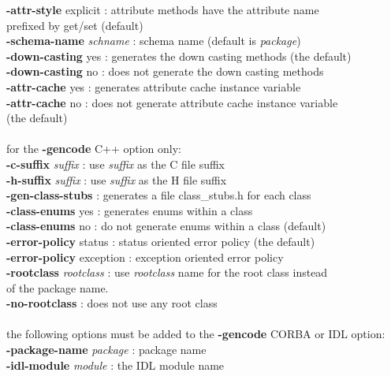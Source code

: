 \begin{tabbing}
{\bf -attr-style} explicit         \>: attribute methods have the attribute name\\
                             \>\> prefixed by get/set (default)\\
{\bf -schema-name} \emph{schname}   \>: schema name (default is \emph{package})\\
{\bf -down-casting} yes            \>: generates the down casting methods (the default)\\
{\bf -down-casting} no             \>: does not generate the down casting methods\\
{\bf -attr-cache} yes              \>: generates attribute cache instance variable\\
{\bf -attr-cache} no               \>: does not generate attribute cache instance variable\\
\>\> (the default)\\
\\
for the {\bf -gencode} C++ option only:\\
{\bf -c-suffix} \emph{suffix}           \>: use \emph{suffix} as the C file suffix\\
{\bf -h-suffix} \emph{suffix}           \>: use \emph{suffix} as the H file suffix\\
{\bf -gen-class-stubs}             \>: generates a file class\_stubs.h for each class\\
{\bf -class-enums} yes             \>: generates enums within a class\\
{\bf -class-enums} no              \>: do not generate enums within a class (default)\\
{\bf -error-policy} status         \>: status oriented error policy (the default)\\
{\bf -error-policy} exception      \>: exception oriented error policy\\
{\bf -rootclass} \emph{rootclass}    \>: use \emph{rootclass} name for the root class instead\\
                             \>\>  of the package name.\\
{\bf -no-rootclass}                \>: does not use any root class\\
\\
the following options must be added to the {\bf -gencode} CORBA or IDL option:\\
{\bf -package-name} \emph{package}      \>: package name\\
{\bf -idl-module} \emph{module}         \>: the IDL module name\\

\end{tabbing}
